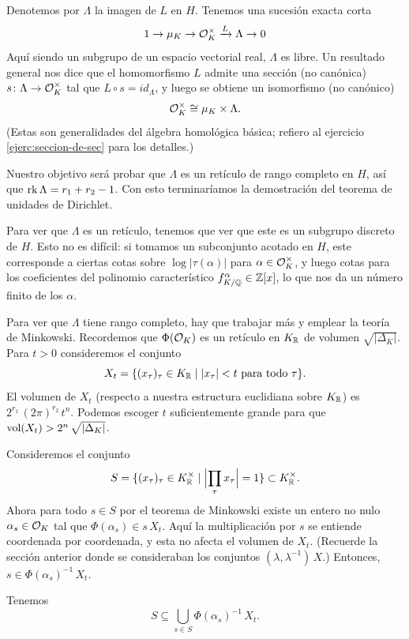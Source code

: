 Denotemos por $\Lambda$ la imagen de $L$ en $H$. Tenemos una sucesión exacta
corta
$$1 \to \mu_K \to \mathcal{O}_K^\times \xrightarrow{L} \Lambda \to 0$$
Aquí siendo un subgrupo de un espacio vectorial real, $\Lambda$ es libre.
Un resultado general nos dice que el homomorfismo $L$ admite una sección
(no canónica) $s\colon \Lambda \to \mathcal{O}_K^\times$ tal que $L\circ s = id_\Lambda$,
y luego se obtiene un isomorfismo (no canónico)
$$\mathcal{O}_K^\times \cong \mu_K \times \Lambda.$$
(Estas son generalidades del álgebra homológica básica; refiero al ejercicio
\ref{ejerc:seccion-de-sec} para los detalles.)

\vspace{1em}

Nuestro objetivo será probar que $\Lambda$ es un retículo de rango completo en
$H$, así que $\operatorname{rk} \Lambda = r_1 + r_2 - 1$. Con esto terminaríamos la
demostración del teorema de unidades de Dirichlet.

Para ver que $\Lambda$ es un retículo, tenemos que ver que este es un subgrupo
discreto de $H$. Esto no es difícil: si tomamos un subconjunto acotado en $H$,
este corresponde a ciertas cotas sobre $\log |\tau (\alpha)|$ para
$\alpha \in \mathcal{O}_K^\times$, y luego cotas para los coeficientes del polinomio
característico $f^\alpha_{K/\mathbb{Q}} \in \mathbb{Z} [x]$, lo que nos da un número finito de
los $\alpha$.

Para ver que $\Lambda$ tiene rango completo, hay que trabajar más y emplear
la teoría de Minkowski. Recordemos que $\Phi (\mathcal{O}_K)$ es un retículo en $K_{\mathbb{R}}$
de volumen $\sqrt{|\Delta_K|}$. Para $t > 0$ consideremos el conjunto
$$X_t = \{ (x_\tau)_\tau \in K_{\mathbb{R}} \mid |x_\tau| < t\text{ para todo }\tau \}.$$
El volumen de $X_t$ (respecto a nuestra estructura euclidiana sobre $K_{\mathbb{R}}$)
es $2^{r_1}\,(2\pi)^{r_2}\,t^n$. Podemos escoger $t$ suficientemente grande
para que $\operatorname{vol} (X_t) > 2^n\,\sqrt{|\Delta_K|}$.

Consideremos el conjunto
$$S = \{ (x_\tau)_\tau \in K_{\mathbb{R}}^\times \mid \Bigl|\prod_\tau x_\tau\Bigr| = 1 \} \subset K_{\mathbb{R}}^\times.$$
Ahora para todo $s \in S$ por el teorema de Minkowski existe un entero no nulo
$\alpha_s \in \mathcal{O}_K$ tal que $\Phi (\alpha_s) \in s\,X_t$. Aquí la multiplicación
por $s$ se entiende coordenada por coordenada, y esta no afecta el volumen de
$X_t$. (Recuerde la sección anterior donde se consideraban los conjuntos
$(\lambda, \lambda^{-1})\,X$.) Entonces, $s \in \Phi (\alpha_s)^{-1}\,X_t$.

Tenemos
$$S \subseteq \bigcup_{s\in S} \Phi (\alpha_s)^{-1}\,X_t.$$


